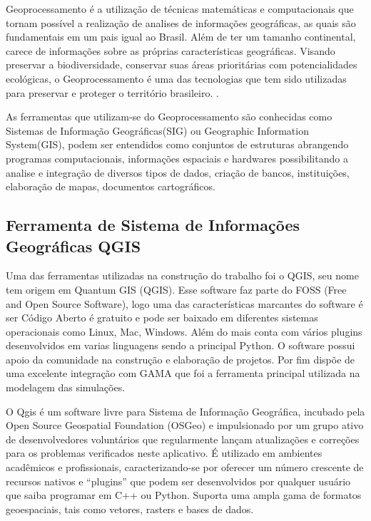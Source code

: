 Geoprocessamento é a utilização de técnicas matemáticas e computacionais que tornam possível a realização de analises de informações geográficas, as quais são fundamentais em um pais igual ao Brasil. Além de ter um tamanho continental, carece de informações sobre as próprias características geográficas. Visando preservar a biodiversidade, conservar suas áreas prioritárias com potencialidades ecológicas, o Geoprocessamento é uma das tecnologias que tem sido utilizadas para preservar e proteger o território brasileiro.\cite{ximenes_modelagem_2008} \cite{georef:online}. 

As ferramentas que utilizam-se do Geoprocessamento são conhecidas como Sistemas de Informação Geográficas(SIG) ou Geographic Information System(GIS), podem ser entendidos como conjuntos de estruturas abrangendo programas computacionais, informações espaciais e hardwares possibilitando a analise e integração de diversos tipos de dados, criação de bancos, instituições, elaboração de mapas, documentos cartográficos\cite{Burrough:online}.




\subsection{Ferramenta de Sistema de Informações Geográficas QGIS}

Uma das ferramentas utilizadas na construção do trabalho foi o QGIS, seu nome tem origem em Quantum GIS (QGIS). Esse software faz parte do FOSS (Free and Open Source Software), logo uma das características marcantes do software é ser Código Aberto é gratuito\cite{Qgis:online} e pode ser baixado em diferentes sistemas operacionais como Linux, Mac, Windows. Além do mais conta com vários plugins desenvolvidos em varias linguagens sendo a principal Python. O software possui apoio da comunidade na construção e elaboração de projetos. Por fim dispõe de uma excelente integração com GAMA que foi a ferramenta principal utilizada na modelagem das simulações. 

O Qgis é um software livre para Sistema de Informação Geográfica, incubado pela Open Source Geospatial Foundation (OSGeo) e impulsionado por um grupo ativo de desenvolvedores voluntários que regularmente lançam atualizações e correções para os problemas verificados neste aplicativo. É utilizado em ambientes acadêmicos e profissionais, caracterizando-se por oferecer um número crescente de recursos nativos e “plugins” que podem ser desenvolvidos por qualquer usuário que saiba programar em C++ ou Python. Suporta uma ampla gama de formatos geoespaciais, tais como vetores, rasters e bases de dados. \cite{bruno2017aplicabilidade}
